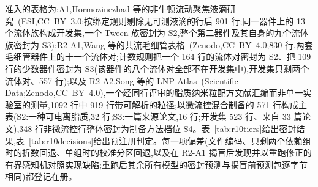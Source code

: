 \documentclass[11pt,a4paper]{ctexart}
\begin{document}
准入的表格为:A1,Hormozinezhad 等的非牛顿流动聚焦液滴研究~\cite{labchip2025dimless}(ESI,CC~BY~3.0;按绑定规则剔除无可测液滴的行后 901 行;同一器件上的 13 个流体族构成开发集,一个 Tween 族密封为 S2,整个第二器件及其自身的九个流体族密封为 S3);R2-A1,Wang 等的共流毛细管表格~\cite{wang2024coflow}(Zenodo,CC~BY~4.0;830 行,两套毛细管器件上的十一个流体对;计数规则把一个 164 行的流体对密封为 S2、把 109 行的少数器件密封为 S3(该器件的八个流体对全部不在开发集中),开发集只剩两个流体对、557 行);以及 R2-A2,Song 等的 LNP Atlas~\cite{lnpatlas2025}(Scientific Data;Zenodo,CC~BY~4.0),一个经同行评审的脂质纳米粒配方文献汇编而非单一实验室的测量,1092 行中 919 行带可解析的粒径;以微流控混合制备的 571 行构成主表(S2:一种可电离脂质,32 行;S3:一篇来源论文,16 行;开发集 523 行、来自 33 篇论文),348 行非微流控行整体密封为制备方法档位 S4。表~\ref{tab:r10tiers}给出密封结果,表~\ref{tab:r10decisions}给出预注册判定。每一项偏差(文件编码、只剩两个依赖组时的折数回退、单组时的校准分区回退,以及在 R2-A1 揭盲后发现并以重跑修正的有界感知机对照实现缺陷;重跑后其余所有模型的密封预测与揭盲前预测包逐字节相同)都登记在册。

\begin{table}[t]
\centering\footnotesize
\caption{R10 密封档位。dev-ref 为锁定 XGBoost 在开发行上的分组交叉验证 MAPE(R2-A1 为 2 折,其余为 5 折);$r$ 为密封 MAPE 除以 dev-ref,附行 bootstrap 95\% 区间;覆盖率为名义 0.90 的分裂共形覆盖率;感知机对为 log 目标(有界)与原尺度(无界)MLP,括号内为非正预测数;$\rho$ 为随机划分与该档位上六模型排名的 Spearman 相关。A1 器件档位的 MLP 值来自预注册运行;R2-A1 的有界 MLP 值来自修正后的重跑。}
\label{tab:r10tiers}
\end{table}
\end{document}
